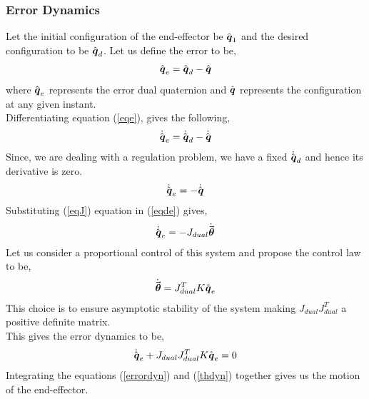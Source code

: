 \documentclass[a4paper,12pt]{article}
\begin{document}
\subsubsection{Error Dynamics}
Let the initial configuration of the end-effector be $\hat{\boldsymbol{q}}_1$ and the desired configuration to be $\hat{\boldsymbol{q}}_d$. Let us define the error to be,
\begin{align}
	\hat{\boldsymbol{q}}_e = \hat{\boldsymbol{q}}_d - \hat{\boldsymbol{q}} \label{eqe}
\end{align}
where $\hat{\boldsymbol{q}}_e$ represents the error dual quaternion and $\hat{\boldsymbol{q}}$ represents the configuration at any given instant.\\
Differentiating equation (\ref{eqe}), gives the following,
\begin{align}
	\dot{\hat{\boldsymbol{q}}}_e = \dot{\hat{\boldsymbol{q}}}_d - \dot{\hat{\boldsymbol{q}}}
\end{align}
Since, we are dealing with a regulation problem, we have a fixed $\dot{\hat{\boldsymbol{q}}}_d$ and hence its derivative is zero.
\begin{align}
	\dot{\hat{\boldsymbol{q}}}_e = - \dot{\hat{\boldsymbol{q}}} \label{eqde}
\end{align}
Substituting (\ref{eqJ}) equation in (\ref{eqde}) gives,
\begin{align}
	\dot{\hat{\boldsymbol{q}}}_e = - J_{dual} \dot{\vec{\boldsymbol{\theta}}}
\end{align}
Let us consider a proportional control of this system and propose the control law to be,
\begin{align}
	\dot{\vec{\boldsymbol{\theta}}} = J_{dual}^T K \hat{\boldsymbol{q}}_e \label{thdyn}
\end{align}
This choice is to ensure asymptotic stability of the system making $J_{dual} J_{dual}^T$ a positive definite matrix\cite{pham2010position}.\\ This gives the error dynamics to be,
\begin{align}
	\dot{\hat{\boldsymbol{q}}}_e+J_{dual} J_{dual}^T K \hat{\boldsymbol{q}}_e \label{errordyn} = 0 
\end{align}
Integrating the equations (\ref{errordyn}) and (\ref{thdyn}) together gives us the motion of the end-effector.\\
\end{document}
